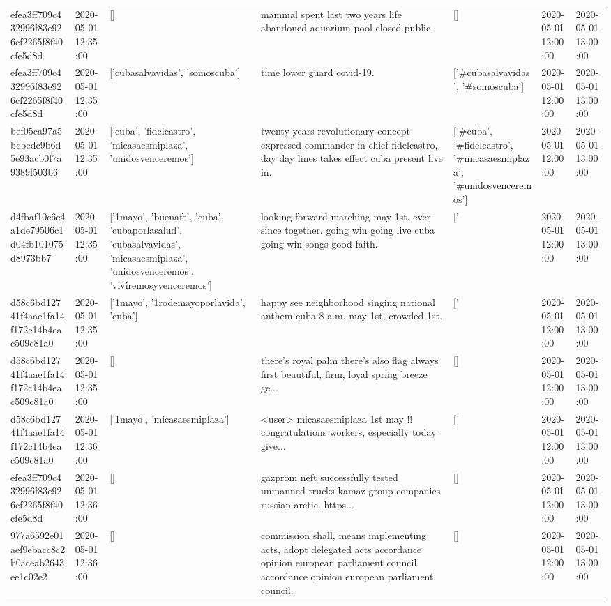 \begin{tabular}{lllllll}
efea3ff709c432996f83e926cf2265f8f40cfe5d8d & 2020-05-01 12:35:00 & [] & mammal spent last two years life abandoned aquarium pool closed public. & [] & 2020-05-01 12:00:00 & 2020-05-01 13:00:00 \\
efea3ff709c432996f83e926cf2265f8f40cfe5d8d & 2020-05-01 12:35:00 & ['cubasalvavidas', 'somoscuba'] & time lower guard covid-19. & ['#cubasalvavidas', '#somoscuba'] & 2020-05-01 12:00:00 & 2020-05-01 13:00:00 \\
bef05ca97a5bcbedc9b6d5e93acb0f7a9389f503b6 & 2020-05-01 12:35:00 & ['cuba', 'fidelcastro', 'micasaesmiplaza', 'unidosvenceremos'] & twenty years revolutionary concept expressed commander-in-chief fidelcastro, day day lines takes effect cuba present live in. & ['#cuba', '#fidelcastro', '#micasaesmiplaza', '#unidosvenceremos'] & 2020-05-01 12:00:00 & 2020-05-01 13:00:00 \\
d4fbaf10c6c4a1de79506c1d04fb101075d8973bb7 & 2020-05-01 12:35:00 & ['1mayo', 'buenafe', 'cuba', 'cubaporlasalud', 'cubasalvavidas', 'micasaesmiplaza', 'unidosvenceremos', 'viviremosyvenceremos'] & looking forward marching may 1st. ever since together. going win going live cuba going win songs good faith. & ['#1mayo', '#cuba', '#cubaporlasalud', '#cubasalvavidas', '#micasaesmiplaza', '#unidosvenceremos', '#viviremosyvenceremos'] & 2020-05-01 12:00:00 & 2020-05-01 13:00:00 \\
d58c6bd12741f4aae1fa14f172c14b4eac509c81a0 & 2020-05-01 12:35:00 & ['1mayo', '1rodemayoporlavida', 'cuba'] & happy see neighborhood singing national anthem cuba 8 a.m. may 1st, crowded 1st. & ['#1mayo', '#1rodemayoporlavida', '#cuba'] & 2020-05-01 12:00:00 & 2020-05-01 13:00:00 \\
d58c6bd12741f4aae1fa14f172c14b4eac509c81a0 & 2020-05-01 12:35:00 & [] & there's royal palm there's also flag always first beautiful, firm, loyal spring breeze ge... & [] & 2020-05-01 12:00:00 & 2020-05-01 13:00:00 \\
d58c6bd12741f4aae1fa14f172c14b4eac509c81a0 & 2020-05-01 12:36:00 & ['1mayo', 'micasaesmiplaza'] & <user> micasaesmiplaza 1st may !!️ congratulations workers, especially today give... & ['#1mayo', '#micasaesmiplaza'] & 2020-05-01 12:00:00 & 2020-05-01 13:00:00 \\
efea3ff709c432996f83e926cf2265f8f40cfe5d8d & 2020-05-01 12:36:00 & [] & gazprom neft successfully tested unmanned trucks kamaz group companies russian arctic. https... & [] & 2020-05-01 12:00:00 & 2020-05-01 13:00:00 \\
977a6592e01aef9ebacc8c2b0aceab2643ee1c02e2 & 2020-05-01 12:36:00 & [] & commission shall, means implementing acts, adopt delegated acts accordance opinion european parliament council, accordance opinion european parliament council. & [] & 2020-05-01 12:00:00 & 2020-05-01 13:00:00 \\

\end{tabular}
